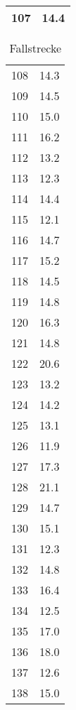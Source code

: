 \begin{multicols}{4}
\begin{table}[H]
\begin{tabular}{|c|r|}
            107 & 14.4 \\
            \hline
        \end{tabular}
    \end{table}
    \columnbreak
    \begin{table}[H]
        \centering
        \begin{tabular}{|c|r|}
            \hline
            108 & 14.3 \\
            109 & 14.5 \\
            110 & 15.0 \\
            111 & 16.2 \\
            112 & 13.2 \\
            113 & 12.3 \\
            114 & 14.4 \\
            115 & 12.1 \\
            116 & 14.7 \\
            117 & 15.2 \\
            118 & 14.5 \\
            119 & 14.8 \\
            120 & 16.3 \\
            121 & 14.8 \\
            122 & 20.6 \\
            123 & 13.2 \\
            124 & 14.2 \\
            125 & 13.1 \\
            126 & 11.9 \\
            127 & 17.3 \\
            128 & 21.1 \\
            129 & 14.7 \\
            130 & 15.1 \\
            131 & 12.3 \\
            132 & 14.8 \\
            133 & 16.4 \\
            134 & 12.5 \\
            135 & 17.0 \\
            136 & 18.0 \\
            137 & 12.6 \\
            138 & 15.0 \\
            \hline
        \end{tabular}
        \caption{Fallstrecke}
    \end{table}
    
\end{multicols}